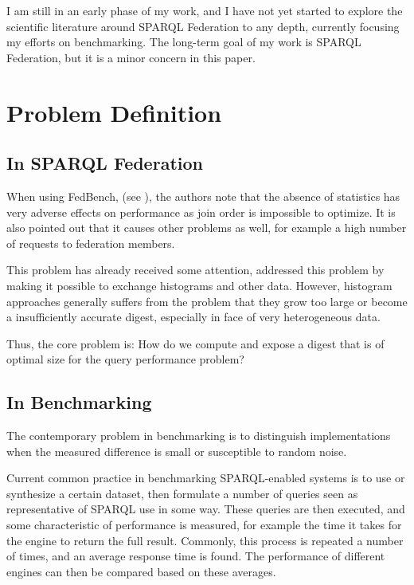 \documentclass{llncs}
\begin{document}
I am still in an early phase of my work, and I have not yet started to
explore the scientific literature around SPARQL Federation to any
depth, currently focusing my efforts on benchmarking. The long-term
goal of my work is SPARQL Federation, but it is a minor concern in
this paper.

\section{Problem Definition}

\subsection{In SPARQL Federation}

When using FedBench, (see \cite{Schmidt:2011:FBS:2063016.2063054}),
the authors note that the absence of statistics has very adverse
effects on performance as join order is impossible to optimize. It is
also pointed out that it causes other problems as well, for example a
high number of requests to federation members. 

This problem has already received some attention, \cite{5337556}
addressed this problem by making it possible to exchange histograms
and other data. However, histogram approaches generally suffers from
the problem that they grow too large or become a insufficiently
accurate digest, especially in face of very heterogeneous data.

Thus, the core problem is: How do we compute and expose a digest that
is of optimal size for the query performance problem?

\subsection{In Benchmarking}

The contemporary problem in benchmarking is to distinguish
implementations when the measured difference is small or susceptible
to random noise.

Current common practice in benchmarking SPARQL-enabled systems is to
use or synthesize a certain dataset, then formulate a number of
queries seen as representative of SPARQL use in some way. These
queries are then executed, and some characteristic of performance is
measured, for example the time it takes for the engine to return the
full result. Commonly, this process is repeated a number of times, and
an average response time is found. The performance of different
engines can then be compared based on these averages.
\end{document}
